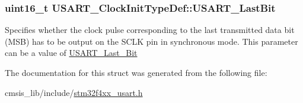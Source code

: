 \subsubsection[{\texorpdfstring{U\+S\+A\+R\+T\+\_\+\+Last\+Bit}{USART_LastBit}}]{\setlength{\rightskip}{0pt plus 5cm}uint16\+\_\+t U\+S\+A\+R\+T\+\_\+\+Clock\+Init\+Type\+Def\+::\+U\+S\+A\+R\+T\+\_\+\+Last\+Bit}\hypertarget{struct_u_s_a_r_t___clock_init_type_def_ab1b28d63d2be6e57849666d78a4467bd}{}\label{struct_u_s_a_r_t___clock_init_type_def_ab1b28d63d2be6e57849666d78a4467bd}
Specifies whether the clock pulse corresponding to the last transmitted data bit (M\+SB) has to be output on the S\+C\+LK pin in synchronous mode. This parameter can be a value of \hyperlink{group___u_s_a_r_t___last___bit}{U\+S\+A\+R\+T\+\_\+\+Last\+\_\+\+Bit} 

The documentation for this struct was generated from the following file\+:\begin{DoxyCompactItemize}
\item 
cmsis\+\_\+lib/include/\hyperlink{stm32f4xx__usart_8h}{stm32f4xx\+\_\+usart.\+h}\end{DoxyCompactItemize}
